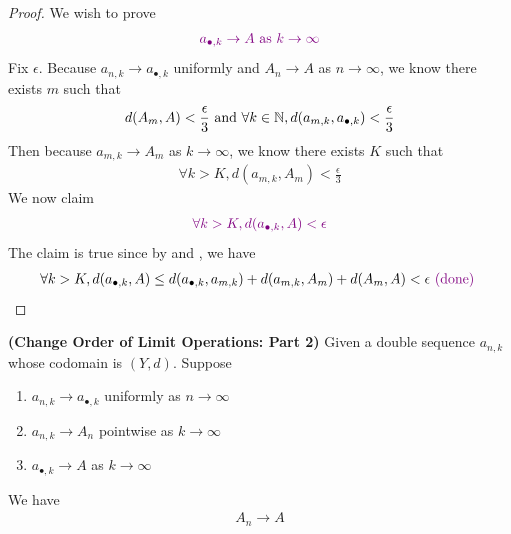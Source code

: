 \documentclass{report}
\begin{document}
\begin{proof}
We wish to prove 
\begin{align*}
\textcolor{violet}{a_{\bullet,k}\to A\text{ as }k\to \infty}
\end{align*}
Fix $\epsilon $. Because $a_{n,k}\to a_{\bullet,k}$ uniformly and $A_n\to A$ as $n\to \infty$, we know there exists $m$ such that 
 \begin{align}
  \label{K1}
d(A_m,A)<\frac{\epsilon}{3}\text{ and }\forall k\in\mathbb{N},d(a_{m,k},a_{\bullet,k})<\frac{\epsilon}{3}
\end{align}
Then because $a_{m,k}\to A_m$ as $k\to \infty$, we know there exists $K$ such that
\begin{align}
\label{K2}
\forall k>K, d(a_{m,k},A_m)<\frac{\epsilon}{3}
\end{align}
We now claim 
\begin{align*}
  \textcolor{violet}{\forall k>K, d(a_{\bullet,k},A)<\epsilon}
\end{align*}
The claim is true since by  and , we have 
\begin{align*}
  \forall k>K, d(a_{\bullet,k},A)\leq d(a_{\bullet,k},a_{m,k})+d(a_{m,k},A_m)+d(A_m,A)<\epsilon \textcolor{violet}{\text{ (done) }}
\end{align*}
\end{proof}
\begin{theorem}
\label{COLO2}
\textbf{(Change Order of Limit Operations: Part 2)} Given a double sequence $a_{n,k}$ whose codomain is $(Y,d)$. Suppose 

\begin{enumerate}[label=(\alph*)]
  \item $a_{n,k}\to a_{\bullet,k}$ uniformly as $n\to \infty$ 
  \item $a_{n,k}\to A_n$ pointwise as $k\to \infty$ 
  \item $a_{\bullet,k}\to A$ as $k\to \infty$
\end{enumerate}
We have
\begin{align*}
A_n \to A
\end{align*}
\end{theorem}
\end{document}
